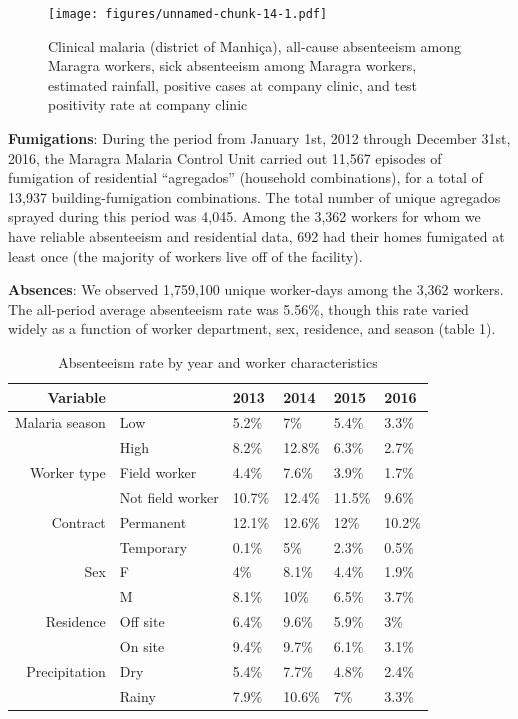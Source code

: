 \documentclass[]{article}
\begin{document}
\begin{figure}
\centering
\texttt{[image: figures/unnamed-chunk-14-1.pdf]}
\caption{Clinical malaria (district of Manhiça), all-cause absenteeism
among Maragra workers, sick absenteeism among Maragra workers, estimated
rainfall, positive cases at company clinic, and test positivity rate at
company clinic}
\end{figure}

\textbf{Fumigations}: During the period from January 1st, 2012 through
December 31st, 2016, the Maragra Malaria Control Unit carried out 11,567
episodes of fumigation of residential ``agregados'' (household
combinations), for a total of 13,937 building-fumigation combinations.
The total number of unique agregados sprayed during this period was
4,045. Among the 3,362 workers for whom we have reliable absenteeism and
residential data, 692 had their homes fumigated at least once (the
majority of workers live off of the facility).

\textbf{Absences}: We observed 1,759,100 unique worker-days among the
3,362 workers. The all-period average absenteeism rate was 5.56\%,
though this rate varied widely as a function of worker department, sex,
residence, and season (table 1).

\begin{table}[ht]
\centering
\begin{tabular}{rlllll}
  \hline
Variable &  & 2013 & 2014 & 2015 & 2016 \\ 
  \hline
Malaria season & Low & 5.2\% & 7\% & 5.4\% & 3.3\% \\ 
   & High & 8.2\% & 12.8\% & 6.3\% & 2.7\% \\ 
  Worker type & Field worker & 4.4\% & 7.6\% & 3.9\% & 1.7\% \\ 
   & Not field worker & 10.7\% & 12.4\% & 11.5\% & 9.6\% \\ 
  Contract & Permanent & 12.1\% & 12.6\% & 12\% & 10.2\% \\ 
   & Temporary & 0.1\% & 5\% & 2.3\% & 0.5\% \\ 
  Sex & F & 4\% & 8.1\% & 4.4\% & 1.9\% \\ 
   & M & 8.1\% & 10\% & 6.5\% & 3.7\% \\ 
  Residence & Off site & 6.4\% & 9.6\% & 5.9\% & 3\% \\ 
   & On site & 9.4\% & 9.7\% & 6.1\% & 3.1\% \\ 
  Precipitation & Dry & 5.4\% & 7.7\% & 4.8\% & 2.4\% \\ 
   & Rainy & 7.9\% & 10.6\% & 7\% & 3.3\% \\ 
   \hline
\end{tabular}
\caption{Absenteeism rate by year and worker characteristics} 
\end{table}
\end{document}
